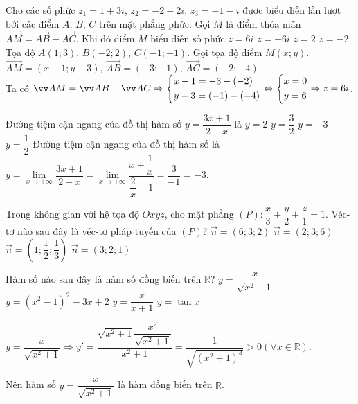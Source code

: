 \begin{ex}%
	Cho các số phức $z_1=1+3i$, $z_2=-2+2i$, $z_3=-1-i$ được biểu diễn lần lượt bởi các điểm $A$, $B$, $C$ trên mặt phẳng phức. Gọi $M$ là điểm thỏa mãn $\overrightarrow{AM}=\overrightarrow{AB}-\overrightarrow{AC}$. Khi đó điểm $M$ biểu diễn số phức
	\choice
	{\True $z=6i$}
	{$z=-6i$}
	{$z=2$}
	{$z=-2$}
	\loigiai
	{
		Tọa độ $A(1;3)$, $B(-2;2)$, $C(-1;-1)$. Gọi tọa độ điểm $M(x;y)$.\\
		$\overrightarrow{AM}=(x-1;y-3)$, $\overrightarrow{AB}=(-3;-1)$, $\overrightarrow{AC}=(-2;-4)$.\\
		Ta có $\overrightarrow{AM}=\overrightarrow{AB}-\overrightarrow{AC}\Rightarrow \heva{&x-1=-3-(-2)\\&y-3=(-1)-(-4)}\Leftrightarrow \heva{&x=0\\&y=6}\Rightarrow z=6i$.
	}
\end{ex} 

\begin{ex}%
	Đường tiệm cận ngang của đồ thị hàm số $y=\dfrac{3x+1}{2-x}$ là
	\choice
	{$y=2$}
	{$y=\dfrac{3}{2}$}
	{\True $y=-3$}
	{$y=\dfrac{1}{2}$}
	\loigiai
	{
		Đường tiệm cận ngang của đồ thị hàm số là $y=\lim\limits_{x\rightarrow \pm \infty}\dfrac{3x+1}{2-x}=\lim\limits_{x\rightarrow \pm \infty}\dfrac{x+\dfrac{1}{x}}{\dfrac{2}{x}-1}=\dfrac{3}{-1}=-3$.
	}
\end{ex} 

\begin{ex}%
	Trong không gian với hệ tọa độ $Oxyz$, cho mặt phẳng $(P)\colon \dfrac{x}{3}+\dfrac{y}{2}+\dfrac{z}{1}=1$. Véc-tơ nào sau đây là véc-tơ pháp tuyến của $(P)$?	
	\choice
	{$\vec{n}=(6;3;2)$}
	{\True $\vec{n}=(2;3;6)$}
	{$\vec{n}=(1;\dfrac{1}{2};\dfrac{1}{3})$}
	{$\vec{n}=(3;2;1)$}
\end{ex} 

\begin{ex}%
	Hàm số nào sau đây là hàm số đồng biến trên $\mathbb{R}$?
	\choice
	{\True $y=\dfrac{x}{\sqrt{x^2+1}}$}
	{$y=(x^2-1)^2-3x+2$}
	{$y=\dfrac{x}{x+1}$}
	{$y=\tan x$}
	\loigiai
	{
		\begin{center}
			$y=\dfrac{x}{\sqrt{x^2+1}}\Rightarrow y'=\dfrac{\sqrt{x^2+1}\dfrac{x^2}{\sqrt{x^2+1}}}{x^2+1}=\dfrac{1}{\sqrt{\left(x^2+1\right)^3}}>0(\forall x\in \mathbb{R})$.
		\end{center}
		Nên hàm số $y=\dfrac{x}{\sqrt{x^2+1}}$ là hàm đồng biến trên $\mathbb{R}$.
	}
\end{ex} 

